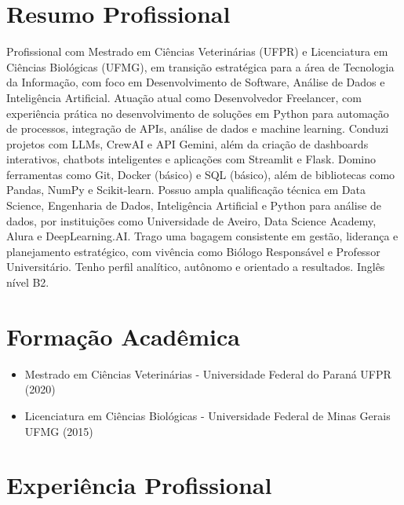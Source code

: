 \documentclass[a4paper,10pt]{article} %
\begin{document}
\section*{Resumo Profissional}
Profissional com Mestrado em Ciências Veterinárias (UFPR) e Licenciatura em Ciências Biológicas (UFMG), em transição estratégica para a área de Tecnologia da Informação, com foco em Desenvolvimento de Software, Análise de Dados e Inteligência Artificial. Atuação atual como Desenvolvedor Freelancer, com experiência prática no desenvolvimento de soluções em Python para automação de processos, integração de APIs, análise de dados e machine learning. Conduzi projetos com LLMs, CrewAI e API Gemini, além da criação de dashboards interativos, chatbots inteligentes e aplicações com Streamlit e Flask. Domino ferramentas como Git, Docker (básico) e SQL (básico), além de bibliotecas como Pandas, NumPy e Scikit-learn. Possuo ampla qualificação técnica em Data Science, Engenharia de Dados, Inteligência Artificial e Python para análise de dados, por instituições como Universidade de Aveiro, Data Science Academy, Alura e DeepLearning.AI. Trago uma bagagem consistente em gestão, liderança e planejamento estratégico, com vivência como Biólogo Responsável e Professor Universitário. Tenho perfil analítico, autônomo e orientado a resultados. Inglês nível B2.

\section*{Formação Acadêmica}
\begin{itemize}
    \item Mestrado em Ciências Veterinárias - Universidade Federal do Paraná UFPR (2020) %
    \item Licenciatura em Ciências Biológicas - Universidade Federal de Minas Gerais UFMG (2015) %
\end{itemize}

\section*{Experiência Profissional}
\end{document}
